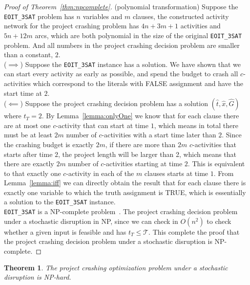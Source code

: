 \documentclass[11pt]{article}
\newtheorem{theorem}{Theorem}
\begin{document}
	\begin{proof}[Proof of Theorem~\ref{thm:npcomplete}]
		(polynomial transformation) 
		Suppose the \verb|EOIT_3SAT| problem has \(n\) variables and \(m\) clauses, the constructed activity network for the project crashing problem has \(4n + 3m + 1\) activities and \(5n + 12m\) arcs, which are both polynomial in the size of the original \verb|EOIT_3SAT| problem. And all numbers in the project crashing decision problem are smaller than a constant, \(2\).\\
		(\(\implies\)) Suppose the \verb|EOIT_3SAT| instance has a solution. We have shown that we can start every activity as early as possible, and spend the budget to crash all \(c\)-activities which correspond to the literals with FALSE assignment and have the start time at \(2\). \\
		(\(\impliedby\)) Suppose the project crashing decision problem has a solution \((\hat{t},\hat{x},\hat{G})\) where \(t_T = 2\). By Lemma~\ref{lemma:onlyOne} we know that for each clause there are at most one \(c\)-activity that can start at time \(1\), which means in total there must be at least \(2m\) number of \(c\)-activities with a start time later than \(2\). Since the crashing budget is exactly \(2m\), if there are more than \(2m\) \(c\)-activities that starts after time \(2\), the project length will be larger than 2, which means that there are exactly \(2m\) number of \(c\)-activities starting at time \(2\). This is equivalent to that exactly one \(c\)-activity in each of the \(m\) clauses starts at time \(1\). From Lemma~\ref{lemma:iff} we can directly obtain the result that for each clause there is exactly one variable to which the truth assignment is TRUE, which is essentially a solution to the \verb|EOIT_3SAT| instance.\\
		\newline
		\verb|EOIT_3SAT| is a NP-complete problem~\cite{Garey1979ComputersAI}. The project crashing decision problem under a stochastic disruption in NP, since we can check in \(O(n^2)\) to check whether a given input is feasible and has \(t_T \leq \mathcal{T}\). This complete the proof that the project crashing decision problem under a stochastic disruption is NP-complete.
	\end{proof}
	\begin{theorem} \label{thm:nphard}
		The project crashing optimization problem under a stochastic disruption is NP-hard.
	\end{theorem}
\end{document}
